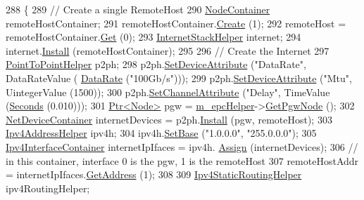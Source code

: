 \begin{DoxyCode}
288     \{
289       \textcolor{comment}{// Create a single RemoteHost}
290       \hyperlink{classns3_1_1NodeContainer}{NodeContainer} remoteHostContainer;
291       remoteHostContainer.\hyperlink{classns3_1_1NodeContainer_a787f059e2813e8b951cc6914d11dfe69}{Create} (1);
292       remoteHost = remoteHostContainer.\hyperlink{classns3_1_1NodeContainer_a9ed96e2ecc22e0f5a3d4842eb9bf90bf}{Get} (0);
293       \hyperlink{classns3_1_1InternetStackHelper}{InternetStackHelper} internet;
294       internet.\hyperlink{classns3_1_1InternetStackHelper_a6645b412f31283d2d9bc3d8a95cebbc0}{Install} (remoteHostContainer);
295 
296       \textcolor{comment}{// Create the Internet}
297       \hyperlink{classns3_1_1PointToPointHelper}{PointToPointHelper} p2ph;
298       p2ph.\hyperlink{classns3_1_1PointToPointHelper_a4577f5ab8c387e5528af2e0fbab1152e}{SetDeviceAttribute} (\textcolor{stringliteral}{"DataRate"}, DataRateValue (
      \hyperlink{classns3_1_1DataRate}{DataRate} (\textcolor{stringliteral}{"100Gb/s"})));
299       p2ph.\hyperlink{classns3_1_1PointToPointHelper_a4577f5ab8c387e5528af2e0fbab1152e}{SetDeviceAttribute} (\textcolor{stringliteral}{"Mtu"}, UintegerValue (1500));
300       p2ph.\hyperlink{classns3_1_1PointToPointHelper_a6b5317fd17fb61e5a53f8d66a90b63b9}{SetChannelAttribute} (\textcolor{stringliteral}{"Delay"}, TimeValue (\hyperlink{group__timecivil_ga33c34b816f8ff6628e33d5c8e9713b9e}{Seconds} (0.010)));
301       \hyperlink{classns3_1_1Ptr}{Ptr<Node>} pgw = \hyperlink{classLteX2HandoverMeasuresTestCase_a1ed4aafe2190532479d857923d423d54}{m\_epcHelper}->\hyperlink{classns3_1_1PointToPointEpcHelper_a828ac04ae81b0e323f9ccfc08bcacf21}{GetPgwNode} ();
302       \hyperlink{classns3_1_1NetDeviceContainer}{NetDeviceContainer} internetDevices = p2ph.\hyperlink{classns3_1_1PointToPointHelper_ab9162fea3e88722666fed1106df1f9ec}{Install} (pgw, remoteHost);
303       \hyperlink{classns3_1_1Ipv4AddressHelper}{Ipv4AddressHelper} ipv4h;
304       ipv4h.\hyperlink{classns3_1_1Ipv4AddressHelper_acf7b16dd25bac67e00f5e25f90a9a035}{SetBase} (\textcolor{stringliteral}{"1.0.0.0"}, \textcolor{stringliteral}{"255.0.0.0"});
305       \hyperlink{classns3_1_1Ipv4InterfaceContainer}{Ipv4InterfaceContainer} internetIpIfaces = ipv4h.
      \hyperlink{classns3_1_1Ipv4AddressHelper_af8e7f4a1a7e74c00014a1eac445a27af}{Assign} (internetDevices);
306       \textcolor{comment}{// in this container, interface 0 is the pgw, 1 is the remoteHost}
307       remoteHostAddr = internetIpIfaces.\hyperlink{classns3_1_1Ipv4InterfaceContainer_ae63208dcd222be986822937ee4aa828c}{GetAddress} (1);
308 
309       \hyperlink{classns3_1_1Ipv4StaticRoutingHelper}{Ipv4StaticRoutingHelper} ipv4RoutingHelper;

\end{DoxyCode}
